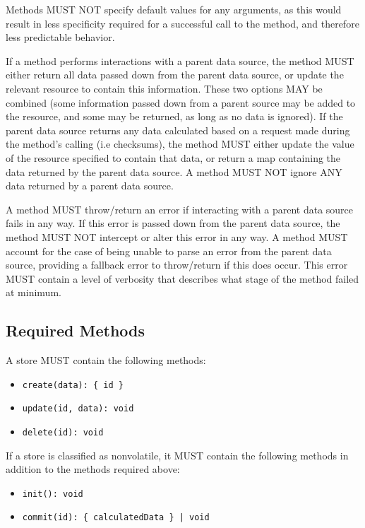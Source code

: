\documentclass{article}
\begin{document}
Methods MUST NOT specify default values for any arguments, as this would result in less specificity required for a successful call to the method, and therefore less predictable behavior. 

If a method performs interactions with a parent data source, the method MUST either return all data passed down from the parent data source, or update the relevant resource to contain this information. These two options MAY be combined (some information passed down from a parent source may be added to the resource, and some may be returned, as long as no data is ignored). If the parent data source returns any data calculated based on a request made during the method's calling (i.e checksums), the method MUST either update the value of the resource specified to contain that data, or return a map containing the data returned by the parent data source. A method MUST NOT ignore ANY data returned by a parent data source.

A method MUST throw/return an error if interacting with a parent data source fails in any way. If this error is passed down from the parent data source, the method MUST NOT intercept or alter this error in any way. A method MUST account for the case of being unable to parse an error from the parent data source, providing a fallback error to throw/return if this does occur. This error MUST contain a level of verbosity that describes what stage of the method failed at minimum.

\subsection{Required Methods}
A store MUST contain the following methods:
\begin{itemize}
    \item \verb|create(data): { id }|
    \item \verb|update(id, data): void|
    \item \verb|delete(id): void|
\end{itemize}
If a store is classified as nonvolatile, it MUST contain the following methods in addition to the methods required above:
\begin{itemize}
    \item \verb|init(): void|
    \item \begin{verbatim}commit(id): { calculatedData } | void\end{verbatim}
\end{itemize}
\end{document}
